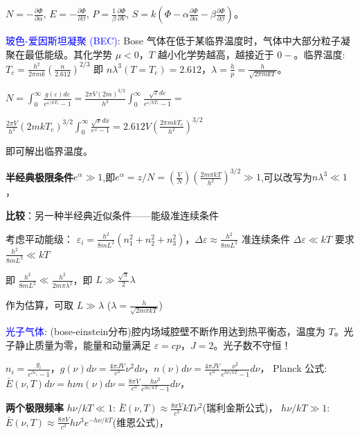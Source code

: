 \documentclass[a4paper,8pt]{extarticle} %
\newcommand{\bluetext}[1]{\textcolor{blue}{#1}}
\begin{document}
\begin{multicols}{3}
$N = -\frac{\partial\Phi}{\partial\alpha}$, $E = -\frac{\partial\Phi}{\partial\beta}$, $P = \frac{1}{\beta}\frac{\partial\Phi}{\partial V}$, $S = k\left(\Phi - \alpha\frac{\partial\Phi}{\partial\alpha} - \beta\frac{\partial\Phi}{\partial\beta}\right)$。

\bluetext{玻色-爱因斯坦凝聚 (BEC)}: Bose 气体在低于某临界温度时，气体中大部分粒子凝聚在最低能级。其化学势 $\mu < 0$，$T$ 越小化学势越高，越接近于 $0-$。临界温度: $T_c = \frac{h^2}{2\pi mk}\left(\frac{n}{2.612}\right)^{2/3}$ 即 $n\lambda^3(T=T_c) = 2.612$，$\lambda = \frac{h}{p} = \frac{h}{\sqrt{2\pi mkT}}$。

$N = \int_0^{\infty}\frac{g(\varepsilon)d\varepsilon}{e^{\varepsilon/kT_c}-1} = \frac{2\pi V(2m)^{3/2}}{h^3}\int_0^{\infty}\frac{\sqrt{\varepsilon}d\varepsilon}{e^{\varepsilon/kT_c}-1}=$

$\frac{2\pi V}{h^3}(2mkT_c)^{3/2}\int_0^{\infty}\frac{\sqrt{x}dx}{e^x-1} = 2.612V\left(\frac{2\pi mkT_c}{h^2}\right)^{3/2}$

即可解出临界温度。

\textbf{半经典极限条件}$e^{\alpha} \gg 1$,即$e^\alpha = z/N =(\frac{V}{N})(\frac{2m\pi kT}{h^2})^{3/2} \gg 1$,可以改写为$n\lambda^3 \ll 1$，

\textbf{比较}：另一种半经典近似条件——能级准连续条件

考虑平动能级：
$\varepsilon_i = \frac{h^2}{8mL^2}(n_1^2 + n_2^2 + n_3^2)$，$\Delta\varepsilon \approx \frac{h^2}{8mL^2}$
准连续条件 $\Delta\varepsilon \ll kT$ 要求 $\frac{h^2}{8mL^2} \ll kT$

即 $\frac{h^2}{8mL^2} \ll \frac{h^2}{2m\pi\lambda^2}$，即 $L \gg \frac{\sqrt{\pi}}{2}\lambda$

作为估算，可取 $L \gg \lambda$ ($\lambda = \frac{h}{\sqrt{2m\pi kT}}$)

\bluetext{光子气体}: (bose-einstein分布)腔内场域腔壁不断作用达到热平衡态，温度为 $T$。光子静止质量为零，能量和动量满足 $\varepsilon = cp$，$J = 2$。光子数不守恒！

$n_i = \frac{g_i}{e^{\beta\varepsilon_i}-1}$，$g(\nu)d\nu = \frac{4\pi JV}{c^3}\nu^2d\nu$，$n(\nu)d\nu = \frac{4\pi JV}{c^3}\frac{\nu^2}{e^{h\nu/kT}-1}d\nu$，
Planck 公式: $\bar{E}(\nu,T)d\nu = h\nu n(\nu)d\nu = \frac{8\pi V}{c^3}\frac{h\nu^3}{e^{h\nu/kT}-1}d\nu$，

\textbf{两个极限频率}
$h\nu/kT \ll 1$: $\bar{E}(\nu,T) \approx \frac{8\pi V}{c^3}kT\nu^2$(瑞利金斯公式)，
$h\nu/kT \gg 1$: $\bar{E}(\nu,T) \approx \frac{8\pi V}{c^3}h\nu^3e^{-h\nu/kT}$(维恩公式)，


\end{multicols}
\end{document}

